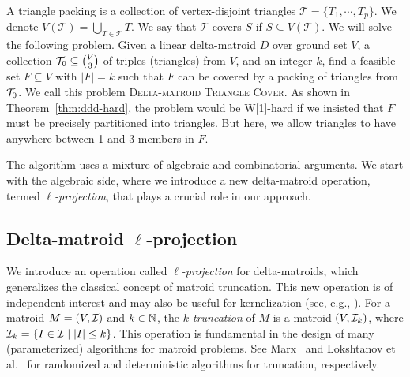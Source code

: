 

A triangle packing is a collection of vertex-disjoint triangles $\mathcal{T} = \{ T_1, \cdots, T_{p} \}$.
We denote $V(\mathcal{T}) = \bigcup_{T \in \mathcal{T}} T$.
We say that $\mathcal{T}$ covers $S$ if $S \subseteq V(\mathcal{T})$.
We will solve the following problem. Given a linear delta-matroid $D$
over ground set $V$, a collection $\mathcal T_0 \subseteq \binom{V}{3}$ of
triples (triangles) from $V$, and an integer $k$,
find a feasible set $F \subseteq V$ with $|F|=k$ such that $F$ can be
covered by a packing of triangles from $\mathcal T_0$.
We call this problem \textsc{Delta-matroid Triangle Cover}.
As shown in Theorem~\ref{thm:ddd-hard}, the problem would be W[1]-hard if we insisted that $F$ must
be precisely partitioned into triangles. But here, we allow triangles
to have anywhere between 1 and 3 members in $F$.

The algorithm uses a mixture of algebraic and combinatorial arguments.  
We start with the algebraic side, where we introduce a new delta-matroid operation,  
termed \emph{$\ell$-projection}, that plays a crucial role in our approach.

\subsection{Delta-matroid $\ell$-projection}

We introduce an operation called \emph{$\ell$-projection} for delta-matroids,  
which generalizes the classical concept of matroid truncation.  
This new operation is of independent interest and may also be useful for kernelization  
(see, e.g., \cite{Wahlstrom24SODA}).
For a matroid $M = (V, \mathcal I)$ and $k \in \mathbb N$, the \emph{$k$-truncation} of $M$ is a matroid $(V, \mathcal I_k)$, where $\mathcal I_k = \{ I \in \mathcal I \mid |I| \le k \}$.
This operation is fundamental in the design of many (parameterized) algorithms for matroid problems.
See Marx~\cite{Marx09-matroid} and Lokshtanov et al.~\cite{LokshtanovMPS18TALG} for randomized and deterministic algorithms for truncation, respectively.

